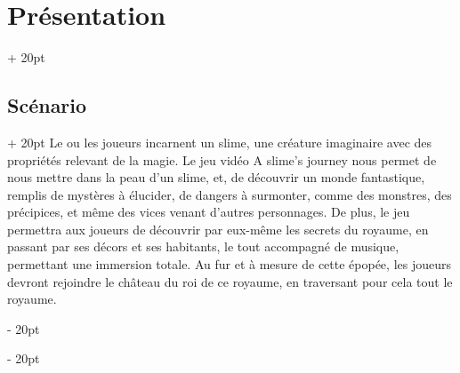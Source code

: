 \documentclass[a4paper, 12pt, twoside]{article}
\newcommand{\ind}[1][20pt]{\advance\leftskip + #1}
\newcommand{\deind}[1][20pt]{\advance\leftskip - #1}
\newenvironment{indt}[2][20pt]{#2 \par \ind[#1]}{\par \deind} %
\begin{document}
    \begin{indt}{\section{Présentation}}
        \begin{indt}{\subsection{Scénario}}
            Le ou les joueurs incarnent un slime, une créature imaginaire avec des propriétés relevant de la magie. Le jeu vidéo A slime's journey nous permet de nous mettre dans la peau d'un slime, et, de découvrir un monde fantastique, remplis de mystères à élucider, de dangers à surmonter, comme des monstres, des précipices, et même des vices venant d'autres personnages. De plus, le jeu permettra aux joueurs de découvrir par eux-même les secrets du royaume, en passant par ses décors et ses habitants, le tout accompagné de musique, permettant une immersion totale. Au fur et à mesure de cette épopée, les joueurs devront rejoindre le château du roi de ce royaume, en traversant pour cela tout le royaume.
        \end{indt}
        

\end{indt}
\end{document}
